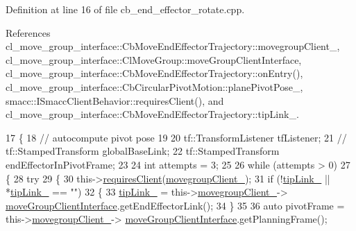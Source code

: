 Definition at line 16 of file cb\+\_\+end\+\_\+effector\+\_\+rotate.\+cpp.



References cl\+\_\+move\+\_\+group\+\_\+interface\+::\+Cb\+Move\+End\+Effector\+Trajectory\+::movegroup\+Client\+\_\+, cl\+\_\+move\+\_\+group\+\_\+interface\+::\+Cl\+Move\+Group\+::move\+Group\+Client\+Interface, cl\+\_\+move\+\_\+group\+\_\+interface\+::\+Cb\+Move\+End\+Effector\+Trajectory\+::on\+Entry(), cl\+\_\+move\+\_\+group\+\_\+interface\+::\+Cb\+Circular\+Pivot\+Motion\+::plane\+Pivot\+Pose\+\_\+, smacc\+::\+I\+Smacc\+Client\+Behavior\+::requires\+Client(), and cl\+\_\+move\+\_\+group\+\_\+interface\+::\+Cb\+Move\+End\+Effector\+Trajectory\+::tip\+Link\+\_\+.


\begin{DoxyCode}
17     \{
18         \textcolor{comment}{// autocompute pivot pose}
19 
20         tf::TransformListener tfListener;
21         \textcolor{comment}{// tf::StampedTransform globalBaseLink;}
22         tf::StampedTransform endEffectorInPivotFrame;
23 
24         \textcolor{keywordtype}{int} attempts = 3;
25 
26         \textcolor{keywordflow}{while} (attempts > 0)
27         \{
28             \textcolor{keywordflow}{try}
29             \{
30                 this->\hyperlink{classsmacc_1_1ISmaccClientBehavior_a32b16e99e3b4cb289414203dc861a440}{requiresClient}(\hyperlink{classcl__move__group__interface_1_1CbMoveEndEffectorTrajectory_aea650d3e7836125b32be97392b71a7f3}{movegroupClient\_});
31                 \textcolor{keywordflow}{if} (!\hyperlink{classcl__move__group__interface_1_1CbMoveEndEffectorTrajectory_a24c6c30b9b0761a61fa002d947bd3e11}{tipLink\_} || *\hyperlink{classcl__move__group__interface_1_1CbMoveEndEffectorTrajectory_a24c6c30b9b0761a61fa002d947bd3e11}{tipLink\_} == \textcolor{stringliteral}{""})
32                 \{
33                     \hyperlink{classcl__move__group__interface_1_1CbMoveEndEffectorTrajectory_a24c6c30b9b0761a61fa002d947bd3e11}{tipLink\_} = this->\hyperlink{classcl__move__group__interface_1_1CbMoveEndEffectorTrajectory_aea650d3e7836125b32be97392b71a7f3}{movegroupClient\_}->
      \hyperlink{classcl__move__group__interface_1_1ClMoveGroup_a92922ea689e4e1b7b91512c56629c95b}{moveGroupClientInterface}.getEndEffectorLink();
34                 \}
35 
36                 \textcolor{keyword}{auto} pivotFrame = this->\hyperlink{classcl__move__group__interface_1_1CbMoveEndEffectorTrajectory_aea650d3e7836125b32be97392b71a7f3}{movegroupClient\_}->
      \hyperlink{classcl__move__group__interface_1_1ClMoveGroup_a92922ea689e4e1b7b91512c56629c95b}{moveGroupClientInterface}.getPlanningFrame();

\end{DoxyCode}
